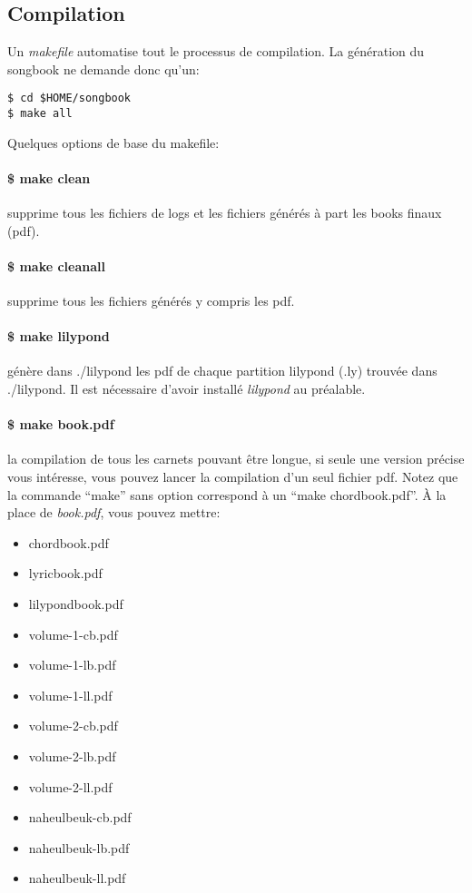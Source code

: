 \documentclass[a4paper]{article}
\begin{document}
\subsection{Compilation}

Un \emph{makefile} automatise tout le processus de compilation. La
génération du songbook ne demande donc qu'un: 

\begin{verbatim}
$ cd $HOME/songbook
$ make all
\end{verbatim}

Quelques options de base du makefile:

\paragraph{\$ make clean} 
supprime tous les fichiers de logs et les fichiers générés à part les
books finaux (pdf).

\paragraph{\$ make cleanall}
supprime tous les fichiers générés y compris les pdf.

\paragraph{\$ make lilypond}
génère dans ./lilypond les pdf de chaque partition lilypond (.ly)
trouvée dans ./lilypond. Il est nécessaire d'avoir installé
\emph{lilypond} au préalable.

\paragraph{\$ make book.pdf}
la compilation de tous les carnets pouvant être longue, si seule une
version précise vous intéresse, vous pouvez lancer la compilation d'un
seul fichier pdf. Notez que la commande ``make'' sans option correspond à un ``make chordbook.pdf''. À la place de \emph{book.pdf}, vous pouvez mettre:
\begin{itemize}
\item chordbook.pdf
\item lyricbook.pdf
\item lilypondbook.pdf
\item volume-1-cb.pdf
\item volume-1-lb.pdf
\item volume-1-ll.pdf
\item volume-2-cb.pdf
\item volume-2-lb.pdf
\item volume-2-ll.pdf
\item naheulbeuk-cb.pdf
\item naheulbeuk-lb.pdf
\item naheulbeuk-ll.pdf
\end{itemize}
\end{document}

